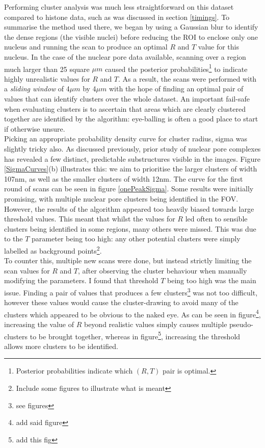 \documentclass[11pt]{article}
\begin{document}
Performing cluster analysis was much less straightforward on this dataset compared to histone data, such as was discussed in section \ref{timings}. To summarise the method used there, we began by using a Gaussian blur to identify the dense regions (the visible nuclei) before reducing the ROI to enclose only one nucleus and running the scan to produce an optimal $R$ and $T$ value for this nucleus. In the case of the nuclear pore data available, scanning over a region much larger than 25 square $\mu m$ caused the posterior probabilities\footnote{Posterior probabilities indicate which $(R,T)$ pair is optimal.} to indicate highly unrealistic values for $R$ and $T$. As a result, the scans were performed with a \textit{sliding window} of 4$\mu m$ by 4$\mu m$ with the hope of finding an optimal pair of values that can identify clusters over the whole dataset. An important fail-safe when evaluating clusters is to ascertain that areas which are clearly clustered together are identified by the algorithm: eye-balling is often a good place to start if otherwise unsure. \\

Picking an appropriate probability density curve for cluster radius, sigma was slightly tricky also. As discussed previously, prior study of nuclear pore complexes has revealed a few distinct, predictable substructures visible in the images. Figure \ref{SigmaCurves}(b) illustrates this: we aim to prioritise the larger clusters of width 107nm, as well as the smaller clusters of width 12nm. The curve for the first round of scans can be seen in figure \ref{onePeakSigma}. Some results were initially promising, with multiple nuclear pore clusters being identified in the FOV. However, the results of the algorithm appeared too heavily biased towards large threshold values. This meant that whilst the values for $R$ led often to sensible clusters being identified in some regions, many others were missed. This was due to the $T$ parameter being too high: any other potential clusters were simply labelled as background points\footnote{Include some figures to illustrate what is meant}. \\

To counter this, multiple new scans were done, but instead strictly limiting the scan values for $R$ and $T$, after observing the cluster behaviour when manually modifying the parameters. I found that threshold $T$ being too high was the main issue. Finding a pair of values that produces a few clusters\footnote{see figures} was not too difficult, however these values would cause the cluster-drawing to avoid many of the clusters which appeared to be obvious to the naked eye. As can be seen in figure\footnote{add said figure}, increasing the value of $R$ beyond realistic values simply causes multiple pseudo-clusters to be brought together, whereas in figure\footnote{add this fig}, increasing the threshold allows more clusters to be identified.\\
\end{document}
